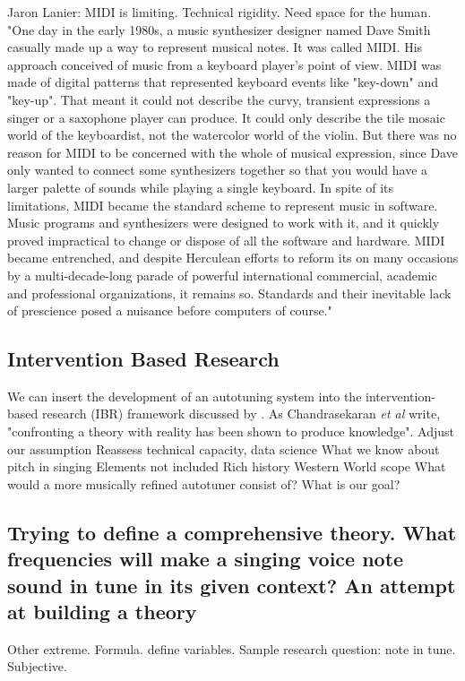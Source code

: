 Jaron Lanier: MIDI is limiting. Technical rigidity. Need space for the human. "One day in the early 1980s, a music synthesizer designer named Dave Smith casually made up a way to represent musical notes. It was called MIDI. His approach conceived of music from a keyboard player's point of view. MIDI was made of digital patterns that represented keyboard events like "key-down" and "key-up". 
That meant it could not describe the curvy, transient expressions a singer or a saxophone player can produce. It could only describe the tile mosaic world of the keyboardist, not the watercolor world of the violin. But there was no reason for MIDI to be concerned with the whole of musical expression, since Dave only wanted to connect some synthesizers together so that you would have a larger palette of sounds while playing a single keyboard. In spite of its limitations, MIDI became the standard scheme to represent music in software. Music programs and synthesizers were designed to work with it, and it quickly proved impractical to change or dispose of all the software and hardware. MIDI became entrenched, and despite Herculean efforts to reform its on many occasions by a multi-decade-long parade of powerful international commercial, academic and professional organizations, it remains so. Standards and their inevitable lack of prescience posed a nuisance before computers of course."

\subsection{Intervention Based Research}
We can insert the development of an autotuning system into the intervention-based research (IBR) framework discussed by \cite{chandrasekaran2020ibr}. As Chandrasekaran \textit{et al} write, "confronting a theory with reality has been shown to produce knowledge". 
Adjust our assumption
Reassess technical capacity, data science
What we know about pitch in singing
Elements not included
Rich history
Western World scope
What would a more musically refined autotuner consist of?
What is our goal?

\subsection{Trying to define a comprehensive theory. What frequencies will make a singing voice note sound in tune in its given context? An attempt at building a theory}
Other extreme. Formula. define variables.
Sample research question: note in tune.
Subjective.

